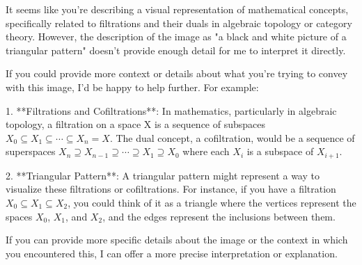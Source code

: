 It seems like you're describing a visual representation of mathematical concepts, specifically related to filtrations and their duals in algebraic topology or category theory. However, the description of the image as "a black and white picture of a triangular pattern" doesn't provide enough detail for me to interpret it directly.

If you could provide more context or details about what you're trying to convey with this image, I'd be happy to help further. For example:

1. **Filtrations and Cofiltrations**: In mathematics, particularly in algebraic topology, a filtration on a space X is a sequence of subspaces \(X_0 \subseteq X_1 \subseteq \cdots \subseteq X_n = X\). The dual concept, a cofiltration, would be a sequence of superspaces \(X_n \supseteq X_{n-1} \supseteq \cdots \supseteq X_1 \supseteq X_0\) where each \(X_i\) is a subspace of \(X_{i+1}\).

2. **Triangular Pattern**: A triangular pattern might represent a way to visualize these filtrations or cofiltrations. For instance, if you have a filtration \(X_0 \subseteq X_1 \subseteq X_2\), you could think of it as a triangle where the vertices represent the spaces \(X_0\), \(X_1\), and \(X_2\), and the edges represent the inclusions between them.

If you can provide more specific details about the image or the context in which you encountered this, I can offer a more precise interpretation or explanation.